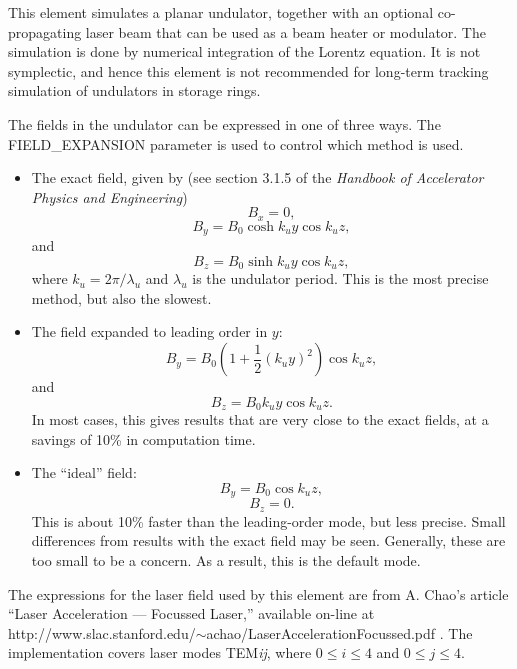 This element simulates a planar undulator, together with an optional
co-propagating laser beam that can be used as a beam heater or
modulator.  The simulation is done by numerical integration of the
Lorentz equation.  It is not symplectic, and hence this element is not
recommended for long-term tracking simulation of undulators in storage
rings.  

The fields in the undulator can be expressed in one of three ways.
The FIELD\_EXPANSION parameter is used to control which method is used.
\begin{itemize}
\item The exact field, given by (see section 3.1.5 of the {\em Handbook of
Accelerator Physics and Engineering})
\begin{equation}
B_x = 0,
\end{equation}
\begin{equation}
B_y = B_0 \cosh k_u y \cos k_u z,
\end{equation}
and
\begin{equation}
B_z = B_0 \sinh k_u y \cos k_u z ,
\end{equation}
where $k_u = 2\pi/\lambda_u$ and $\lambda_u$ is the undulator period.
This is the most precise method, but also the slowest.  

\item The field expanded to leading order in $y$:
\begin{equation}
B_y = B_0 ( 1 + \frac{1}{2}(k_u y)^2 ) \cos k_u z,
\end{equation}
and
\begin{equation}
B_z = B_0 k_u y \cos k_u z.
\end{equation}
In most cases, this gives results that are very close to the exact fields,
at a savings of 10\% in computation time.

\item The ``ideal'' field:
\begin{equation}
B_y = B_0 \cos k_u z,
\end{equation}
\begin{equation}
B_z = 0.
\end{equation}
This is about 10\% faster than the leading-order mode, but less
precise.  Small differences from results with the exact field may be
seen.  Generally, these are too small to be a concern.  As a result,
this is the default mode.
\end{itemize}

The expressions for the laser field used by this element are from
A. Chao's article ``Laser Acceleration --- Focussed Laser,'' available
on-line at \\
http://www.slac.stanford.edu/$\sim$achao/LaserAccelerationFocussed.pdf .
The implementation covers laser modes TEM{\em ij}, where
$0\leq i \leq 4$ and $0 \leq j \leq 4$.

